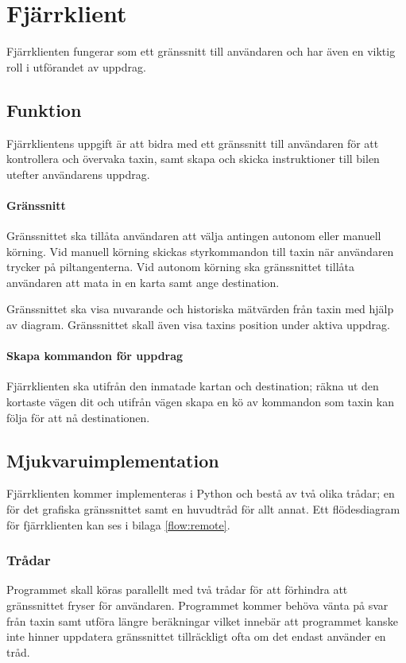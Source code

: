 \documentclass[designspec/spec.tex]{subfiles}
\begin{document}
\section{Fjärrklient}
Fjärrklienten fungerar som ett gränssnitt till användaren och har även en
viktig roll i utförandet av uppdrag.

\subsection{Funktion}
Fjärrklientens uppgift är att bidra med ett gränssnitt till användaren för att
kontrollera och övervaka taxin, samt skapa och skicka instruktioner till bilen
utefter användarens uppdrag.

\paragraph{Gränssnitt}
Gränssnittet ska tillåta användaren att välja antingen autonom eller manuell
körning. Vid manuell körning skickas styrkommandon till taxin när användaren
trycker på piltangenterna. Vid autonom körning ska gränssnittet tillåta
användaren att mata in en karta samt ange destination.

Gränssnittet ska visa nuvarande och historiska mätvärden från taxin med hjälp
av diagram. Gränssnittet skall även visa taxins position under aktiva uppdrag.

\paragraph{Skapa kommandon för uppdrag}
Fjärrklienten ska utifrån den inmatade kartan och destination; räkna ut den
kortaste vägen dit och utifrån vägen skapa en kö av kommandon som taxin kan
följa för att nå destinationen.

\subsection{Mjukvaruimplementation}
Fjärrklienten kommer implementeras i Python och bestå av två olika trådar; en
för det grafiska gränssnittet samt en huvudtråd för allt annat. Ett
flödesdiagram för fjärrklienten kan ses i bilaga \ref{flow:remote}.

\subsubsection{Trådar}
Programmet skall köras parallellt med två trådar för att förhindra att
gränssnittet fryser för användaren. Programmet kommer behöva vänta på svar från
taxin samt utföra längre beräkningar vilket innebär att programmet kanske inte
hinner uppdatera gränssnittet tillräckligt ofta om det endast använder en tråd.
\end{document}
